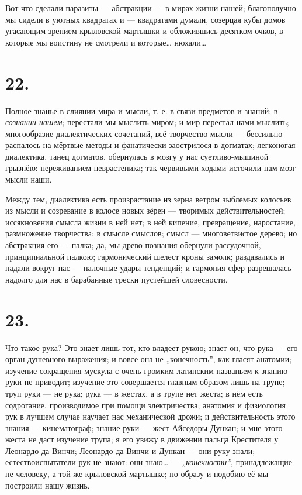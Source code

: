 \documentclass[12pt,a4paper,oneside]{book}
\begin{document}
Вот что сделали паразиты — абстракции — в мирах жизни нашей; благополучно мы сидели в уютных квадратах и — квадратами думали, созерцая кубы домов угасающим зрением крыловской мартышки и обложившись десятком очков, в которые мы воистину не смотрели и которые… нюхали…

\section*{22.}

Полное знанье в слиянии мира и мысли, т. е. в связи предметов и знаний: в \emph{сознании нашем}; перестали мы мыслить миром; и мир перестал нами мыслить; многообразие диалектических сочетаний, всё творчество мысли — бессильно распалось на мёртвые методы и фанатически заострилося в догматах; легконогая диалектика, танец догматов, обернулась в мозгу у нас суетливо-мышиной грызнёю: переживанием неврастеника; так червивыми ходами источили нам мозг мысли наши.

Между тем, диалектика есть произрастание из зерна ветром зыблемых колосьев из мысли и созревание в колосе новых зёрен — творимых действительностей; иссякновения смысла жизни в ней нет; в ней кипение, превращение, наростание, размножение творчества: в смысле смыслов; смысл — многоветвистое дерево; но абстракция его — палка; да, мы древо познания обернули рассудочной, принципиальной палкою; гармонический шелест кроны замолк; раздавались и падали вокруг нас — палочные удары тенденций; и гармония сфер разрешалась надолго для нас в барабанные трески пустейшей словесности.

\section*{23.}

Что такое рука? Это знает лишь тот, кто владеет рукою; знает он, что рука — его орган душевного выражения; и вовсе она не „конечность”, как гласят анатомии; изучение сокращения мускула с очень громким латинским названьем к знанию руки не приводит; изучение это совершается главным образом лишь на трупе; труп руки — не рука; рука — в жестах, а в трупе нет жеста; в нём есть содрогание, производимое при помощи электричества; анатомия и физиология рук в лучшем случае научает нас механической дрожи; и действительность этого знания — кинематограф; знание руки — жест Айседоры Дункан; и мне этого жеста не даст изучение трупа; я его увижу в движении пальца Крестителя у Леонардо-да-Винчи; Леонардо-да-Винчи и Дункан — они руку знали; естествоиспытатели рук не знают: они знаю… — \emph{„конечности”}, принадлежащие не человеку, а той же крыловской мартышке; по образу и подобию её мы построили нашу жизнь.
\end{document}
